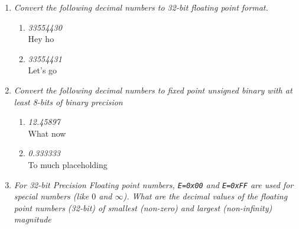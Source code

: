 \documentclass[12pt]{article}
\newcommand{\overbar}[1]{\mkern 1.5mu\overline{\mkern-1.5mu#1\mkern-1.5mu}\mkern 1.5mu}
\begin{document}
\begin{enumerate}
\begin{enumerate}
\begin{center}
\begin{minipage}{0.6\textwidth}
\begin{center}
           \end{center}
         \end{minipage}
       \end{center}
  \end{enumerate}

\newpage
\item \textit{Convert the following decimal numbers to 32-bit floating point format.}
  \begin{enumerate}
      \item \textit{33554430} \\
          Hey ho
      \item \textit{33554431} \\
          Let's go
  \end{enumerate}

\newpage
\item \textit{Convert the following decimal numbers to fixed point unsigned binary with at least 8-bits of binary precision}
  \begin{enumerate}
      \item \textit{12.45897} \\
          What now
      \item \textit{0.333333} \\
          To much placeholding
  \end{enumerate}

\newpage
\item \textit{For 32-bit Precision Floating point numbers, {\tt E=0x00} and {\tt E=0xFF} are used for special numbers (like $0$ and $\infty$). What are the decimal values of the floating point numbers (32-bit) of smallest (non-zero) and largest (non-infinity) magnitude}
\end{enumerate}
\end{document}
